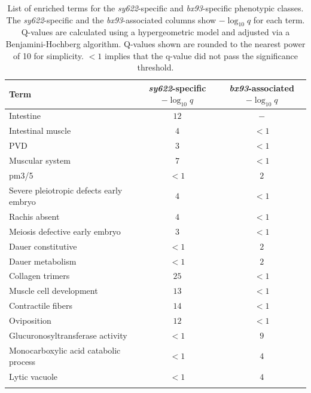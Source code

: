 \documentclass[10pt, onecolumn]{article}
\begin{document}
%
\begin{table}[tbhp]
  \centering
  \begin{tabular}{lcc}
    \toprule{}Term & \emph{sy622}-specific $-\log_{10}{q}$ & \emph{bx93}-associated $-\log_{10}{q}$\\
    \midrule{}Intestine & $12$ & $-$\\
    Intestinal muscle & $4$ & $<1$\\
    PVD & $3$ & $<1$\\
    Muscular system & $7$ & $<1$\\
    pm3/5 & $<1$ & $2$\\
    Severe pleiotropic defects early embryo & $4$ & $<1$\\
    Rachis absent & $4$ & $<1$\\
    Meiosis defective early embryo & $3$ & $<1$\\
    Dauer constitutive & $<1$ &$2$\\
    Dauer metabolism  & $<1$ &$2$\\
    Collagen trimers  & $25$ & $<1$\\
    Muscle cell development & $13$ & $<1$\\
    Contractile fibers & $14$ & $<1$\\
    Oviposition & $12$ & $<1$\\
    Glucuronosyltransferase activity &$<1$ & $9$\\
    Monocarboxylic acid catabolic process &$<1$ & $4$\\
    Lytic vacuole & $<1$& $4$\\
    \bottomrule{}
  \end{tabular}
  \caption{
    List of enriched terms for the \emph{sy622}-specific and
    \emph{bx93}-specific phenotypic classes. The \emph{sy622}-specific and the
    \emph{bx93}-associated columns show $-\log_{10}{q}$ for each term. Q-values
    are calculated using a hypergeometric model and adjusted via a
    Benjamini-Hochberg algorithm. Q-values shown are rounded to the nearest
    power of 10 for simplicity. $<1$ implies that the q-value did not pass the
    significance threshold.
  }
\label{tab:enrich}
\end{table}
\end{document}
